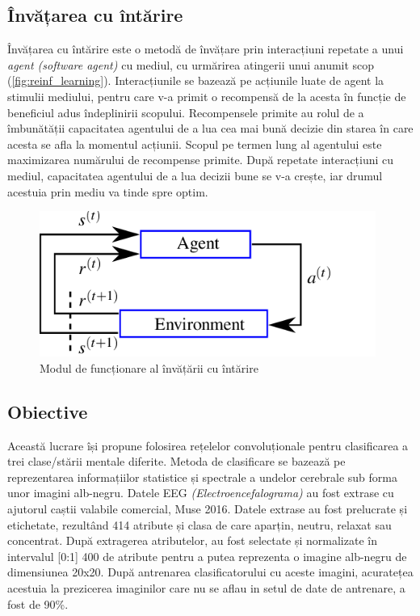 \subsection*{Învățarea cu întărire}
Învățarea cu întărire este o metodă de învățare prin interacțiuni repetate a unui \textit{agent (software agent)} cu mediul, cu urmărirea atingerii unui anumit scop (\autoref*{fig:reinf_learning}). Interacțiunile se bazează pe acțiunile luate de agent la stimulii mediului, pentru care v-a primit o recompensă de la acesta în funcție de beneficiul adus îndeplinirii scopului. Recompensele primite au rolul de a îmbunătății capacitatea agentului de a lua cea mai bună decizie din starea în care acesta se afla la momentul acțiunii. Scopul pe termen lung al agentului este maximizarea numărului de recompense primite. După repetate interacțiuni cu mediul, capacitatea agentului de a lua decizii bune se v-a crește, iar drumul acestuia prin mediu va tinde spre optim.
\begin{figure}[h]
	\center
	\includegraphics[width=11cm, keepaspectratio]{fig/The-reinforcement-learning-paradigm-consists-of-an-agent-interacting-with-an.png}
	\caption{Modul de funcționare al învățării cu întărire \cite{fig:reinforcement}}
	\label{fig:reinf_learning}
\end{figure}

\subsection*{Obiective}
Această lucrare își propune folosirea rețelelor convoluționale pentru clasificarea a trei clase/stării mentale diferite. Metoda de clasificare se bazează pe reprezentarea informațiilor statistice și spectrale a undelor cerebrale sub forma unor imagini alb-negru. Datele EEG \textit{(Electroencefalograma)} au fost extrase cu ajutorul caștii valabile comercial, Muse 2016. Datele extrase au fost prelucrate și etichetate, rezultând 414 atribute și clasa de care aparțin, neutru, relaxat sau concentrat. După extragerea atributelor, au fost selectate și normalizate în intervalul [0:1] 400 de atribute pentru a putea reprezenta o imagine alb-negru de dimensiunea 20x20. După antrenarea clasificatorului cu aceste imagini, acuratețea acestuia la prezicerea imaginilor care nu se aflau in setul de date de antrenare, a fost de 90\%.

